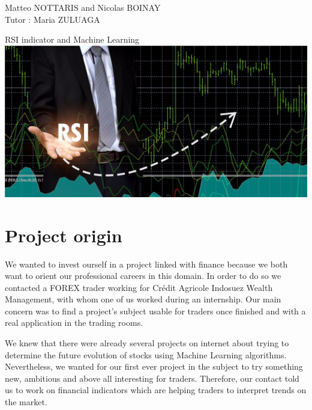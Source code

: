 \documentclass[]{article}
\begin{document}
\begin{titlepage}

\begin{flushleft}
Matteo NOTTARIS and Nicolas BOINAY \\
\bigskip
Tutor : Maria ZULUAGA
\end{flushleft}

\vspace*{\fill}  
\begin{center}  
     {\huge RSI indicator and Machine Learning}\\[30mm]
     \includegraphics[scale=0.35]{image/rsi_bourse.png}
	 \centering
\end{center}
\vspace*{\fill} 

\end{titlepage}

\doublespacing

\renewcommand*\contentsname{Summary}

\tableofcontents
\clearpage
\singlespacing

\section{Project origin}

\vskip 0.5cm
We wanted to invest ourself in a project linked with finance because we both want to orient our professional careers in this domain.
In order to do so we contacted a FOREX trader working for Crédit Agricole Indosuez Wealth Management, with whom one of us worked during an internship. Our main concern was to find a project's subject usable for traders once finished and with a real application in the trading rooms.

\vskip 0.5cm
We knew that there were already several projects on internet about trying to determine the future evolution of stocks using Machine Learning algorithms. Nevertheless, we wanted for our first ever project in the subject to try something new, ambitious and above all interesting for traders. Therefore, our contact told us to work on financial indicators which are helping traders to interpret trends on the market.
\end{document}
